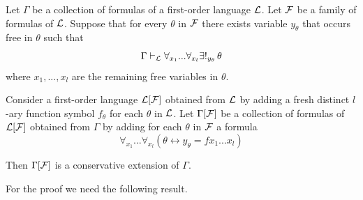 \documentclass[10pt]{amsart}
\begin{document}
\begin{theorem}\label{theorem:extension_by_definite_descriptions_of_function_is_conserative}
  Let $\Gamma$ be a collection of formulas of a first-order language ${\mathcal L}$. Let ${\mathcal F}$ be a family of formulas of ${\mathcal L}$. Suppose that for every $\theta$ in ${\mathcal F}$ there exists variable $y_{\theta}$ that occurs free in $\theta$ such that
  $$\Gamma \vdash_{{\mathcal L}} \forall_{x_1}...\forall_{x_l}\exists!_{y_{\theta}}\,\theta$$
  where $x_1,...,x_l$ are the remaining free variables in $\theta$.

  Consider a first-order language ${\mathcal L}[{\mathcal F}]$ obtained from ${\mathcal L}$ by adding a fresh distinct $l$-ary function symbol $f_{\theta}$ for each $\theta$ in ${\mathcal L}$. Let $\Gamma[{\mathcal F}]$ be a collection of formulas of ${\mathcal L}[{\mathcal F}]$ obtained from $\Gamma$ by adding for each $\theta$ in ${\mathcal F}$ a formula
  $$\forall_{x_1}...\forall_{x_l}\left(\theta \leftrightarrow y_{\theta} = fx_1...x_l\right)$$

  Then $\Gamma[{\mathcal F}]$ is a conservative extension of $\Gamma$.
\end{theorem}
\noindent
For the proof we need the following result.
\end{document}
